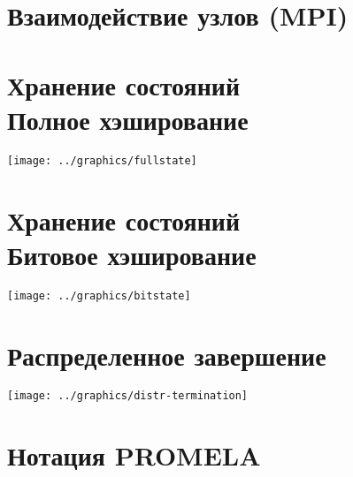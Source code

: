 \documentclass[12pt]{article}
\begin{document}
\section{Взаимодействие узлов (MPI)}
\label{sec:mpi-interaction}

\section{Хранение состояний \\ \small{Полное хэширование}}
\label{sec:fullstate}

\begin{center}
  \texttt{[image: ../graphics/fullstate]}
\end{center}

\section{Хранение состояний \\ \small{Битовое хэширование}}
\label{sec:buthash}

\begin{center}
  \texttt{[image: ../graphics/bitstate]}
\end{center}

\section{Распределенное завершение}
\label{sec:distributed-termination}

\begin{center}
  \texttt{[image: ../graphics/distr-termination]}
\end{center}

\section{Нотация PROMELA}
\label{sec:promela-notation}

\end{document}
